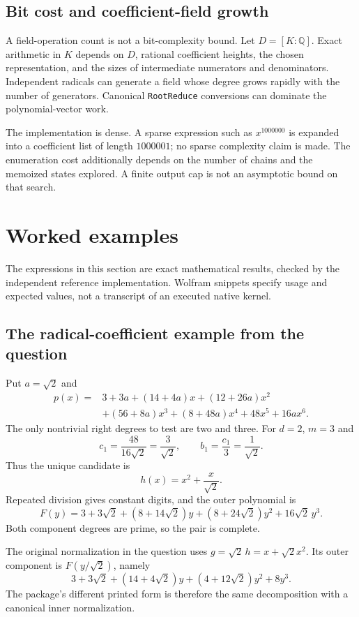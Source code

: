 \documentclass[11pt,letterpaper]{article}
\theoremstyle{definition}
\theoremstyle{remark}
\newcommand{\Q}{\mathbb Q}
\newcommand{\wt}[1]{\texttt{#1}}
\begin{document}
\subsection{Bit cost and coefficient-field growth}
A field-operation count is not a bit-complexity bound. Let
$D=[K:\Q]$. Exact arithmetic in $K$ depends on $D$, rational coefficient
heights, the chosen representation, and the sizes of intermediate
numerators and denominators. Independent radicals can generate a field
whose degree grows rapidly with the number of generators. Canonical
\wt{RootReduce} conversions can dominate the polynomial-vector work.

The implementation is dense. A sparse expression such as $x^{1000000}$
is expanded into a coefficient list of length $1000001$; no sparse
complexity claim is made. The enumeration cost additionally depends on
the number of chains and the memoized states explored. A finite output
cap is not an asymptotic bound on that search.

\section{Worked examples}
\label{sec:examples}
The expressions in this section are exact mathematical results, checked
by the independent reference implementation. Wolfram snippets specify
usage and expected values, not a transcript of an executed native kernel.

\subsection{The radical-coefficient example from the question}
Put $a=\sqrt2$ and
\begin{align*}
 p(x)={}&3+3a+(14+4a)x+(12+26a)x^2\\
       &+(56+8a)x^3+(8+48a)x^4+48x^5+16a x^6.
\end{align*}
The only nontrivial right degrees to test are two and three.
For $d=2$, $m=3$ and
\[
 c_1=\frac{48}{16\sqrt2}=\frac{3}{\sqrt2},
 \qquad b_1=\frac{c_1}{3}=\frac1{\sqrt2}.
\]
Thus the unique candidate is
\[
 h(x)=x^2+\frac{x}{\sqrt2}.
\]
Repeated division gives constant digits, and the outer polynomial is
\begin{equation}\label{eq:originalF}
 F(y)=3+3\sqrt2+(8+14\sqrt2)y
       +(8+24\sqrt2)y^2+16\sqrt2\,y^3.
\end{equation}
Both component degrees are prime, so the pair is complete.

The original normalization in the question uses $g=\sqrt2\,h=x+\sqrt2 x^2$.
Its outer component is $F(y/\sqrt2)$, namely
\[
 3+3\sqrt2+(14+4\sqrt2)y+(4+12\sqrt2)y^2+8y^3.
\]
The package's different printed form is therefore the same decomposition
with a canonical inner normalization.
\end{document}
